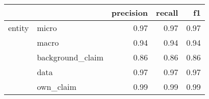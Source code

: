 \begin{tabular}{llrrr}
\toprule
       &           &  precision &  recall &   f1 \\
\midrule
entity & micro &       0.97 &    0.97 & 0.97 \\
       & macro &       0.94 &    0.94 & 0.94 \\
       & background\_claim &       0.86 &    0.86 & 0.86 \\
       & data &       0.97 &    0.97 & 0.97 \\
       & own\_claim &       0.99 &    0.99 & 0.99 \\
\bottomrule
\end{tabular}
